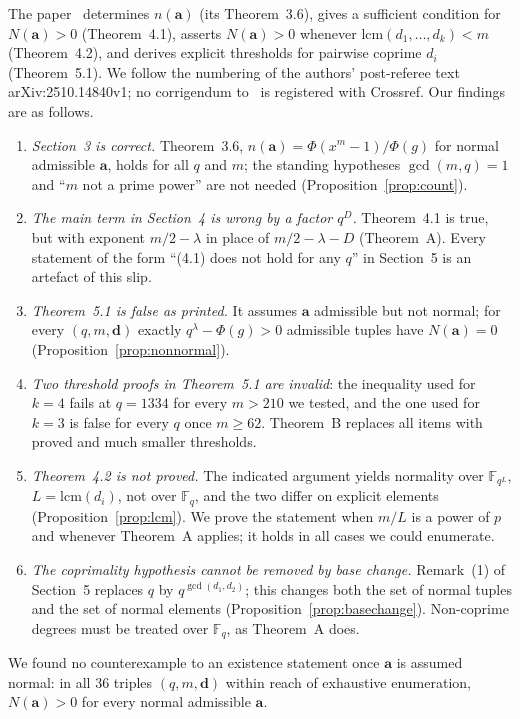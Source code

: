 \documentclass[11pt,a4paper]{amsart}
\theoremstyle{remark}
\newcommand{\F}{\mathbb{F}}
\newcommand{\Fq}{\mathbb{F}_q}
\newcommand{\lcm}{\mathrm{lcm}}
\newcommand{\bd}{\mathbf{d}}
\newcommand{\ba}{\mathbf{a}}
\newcommand{\MKB}{\cite{MKB}}
\begin{document}
The paper \MKB\ determines $n(\ba)$ (its Theorem~3.6), gives a sufficient condition for $N(\ba)>0$
(Theorem~4.1), asserts $N(\ba)>0$ whenever $\lcm(d_1,\dots,d_k)<m$ (Theorem~4.2), and derives explicit
thresholds for pairwise coprime $d_i$ (Theorem~5.1). We follow the numbering of the authors' post-referee text
arXiv:2510.14840v1; no corrigendum to \MKB\ is registered with Crossref. Our findings are as follows.

\begin{enumerate}
\item[(F1)] \emph{Section~3 is correct.} Theorem~3.6, $n(\ba)=\Phi(x^m-1)/\Phi(g)$ for normal admissible
$\ba$, holds for all $q$ and $m$; the standing hypotheses $\gcd(m,q)=1$ and ``$m$ not a prime power'' are
not needed (Proposition~\ref{prop:count}).
\item[(F2)] \emph{The main term in Section~4 is wrong by a factor $q^{D}$.} Theorem~4.1 is true, but with
exponent $m/2-\lambda$ in place of $m/2-\lambda-D$ (Theorem~A). Every statement of the form ``(4.1) does not
hold for any $q$'' in Section~5 is an artefact of this slip.
\item[(F3)] \emph{Theorem~5.1 is false as printed.} It assumes $\ba$ admissible but not normal; for every
$(q,m,\bd)$ exactly $q^{\lambda}-\Phi(g)>0$ admissible tuples have $N(\ba)=0$
(Proposition~\ref{prop:nonnormal}).
\item[(F4)] \emph{Two threshold proofs in Theorem~5.1 are invalid}: the inequality used for $k=4$ fails at
$q=1334$ for every $m>210$ we tested, and the one used for $k=3$ is false for every $q$ once $m\ge62$.
Theorem~B replaces all items with proved and much smaller thresholds.
\item[(F5)] \emph{Theorem~4.2 is not proved.} The indicated argument yields normality over
$\F_{q^{L}}$, $L=\lcm(d_i)$, not over $\Fq$, and the two differ on explicit elements
(Proposition~\ref{prop:lcm}). We prove the statement when $m/L$ is a power of $p$ and whenever Theorem~A
applies; it holds in all cases we could enumerate.
\item[(F6)] \emph{The coprimality hypothesis cannot be removed by base change.} Remark~(1) of Section~5
replaces $q$ by $q^{\gcd(d_1,d_2)}$; this changes both the set of normal tuples and the set of normal
elements (Proposition~\ref{prop:basechange}). Non-coprime degrees must be treated over $\Fq$, as Theorem~A
does.
\end{enumerate}
We found no counterexample to an existence statement once $\ba$ is assumed normal: in all $36$ triples
$(q,m,\bd)$ within reach of exhaustive enumeration, $N(\ba)>0$ for every normal admissible $\ba$.
\end{document}

